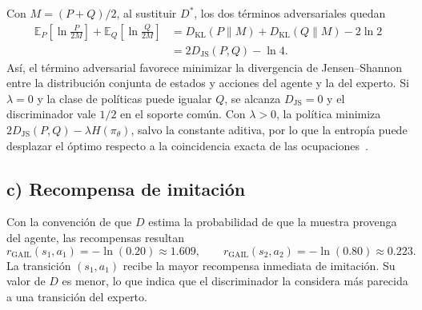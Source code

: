Con $M=(P+Q)/2$, al sustituir $D^*$, los dos términos adversariales
quedan
\begin{align*}
    \mathbb{E}_{P}\!\left[\ln\frac{P}{2M}\right]
       +\mathbb{E}_{Q}\!\left[\ln\frac{Q}{2M}\right]
    &=D_{\mathrm{KL}}(P\|M)+D_{\mathrm{KL}}(Q\|M)-2\ln 2 \\
    &=2D_{\mathrm{JS}}(P,Q)-\ln 4.
\end{align*}
Así, el término adversarial favorece minimizar la divergencia de
Jensen--Shannon entre la distribución conjunta de estados y acciones
del agente y la del experto. Si $\lambda=0$ y la clase de políticas
puede igualar $Q$, se alcanza $D_{\mathrm{JS}}=0$ y el discriminador
vale $1/2$ en el soporte común. Con $\lambda>0$, la política minimiza
$2D_{\mathrm{JS}}(P,Q)-\lambda H(\pi_\theta)$, salvo la constante
aditiva, por lo que la entropía puede desplazar el óptimo respecto a la
coincidencia exacta de las ocupaciones~\cite[seccs.~3--5]{ho2016}.

\subsection*{c) Recompensa de imitación}

Con la convención de que $D$ estima la probabilidad de que la muestra
provenga del agente, las recompensas resultan
\[
    r_{\mathrm{GAIL}}(s_1,a_1)=-\ln(0.20)\approx 1.609,
    \qquad
    r_{\mathrm{GAIL}}(s_2,a_2)=-\ln(0.80)\approx 0.223.
\]
La transición $(s_1,a_1)$ recibe la mayor recompensa inmediata de
imitación. Su valor de $D$ es menor, lo que indica que el
discriminador la considera más parecida a una transición del experto.
